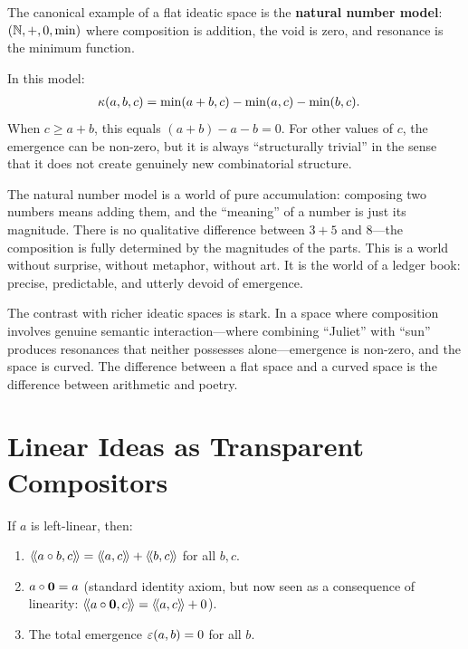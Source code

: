 The canonical example of a flat ideatic space is the \textbf{natural number model}:
$(\mathbb{N}, +, 0, \min)$ where composition is addition, the void is zero, and
resonance is the minimum function.

In this model:
\begin{align*}
\kappa(a, b, c) &= \min(a + b, c) - \min(a, c) - \min(b, c).
\end{align*}
When $c \geq a + b$, this equals $(a + b) - a - b = 0$. For other values of
$c$, the emergence can be non-zero, but it is always ``structurally trivial''
in the sense that it does not create genuinely new combinatorial structure.

\begin{interpretation}
The natural number model is a world of pure accumulation: composing two numbers
means adding them, and the ``meaning'' of a number is just its magnitude. There
is no qualitative difference between $3 + 5$ and $8$---the composition is fully
determined by the magnitudes of the parts. This is a world without surprise,
without metaphor, without art. It is the world of a ledger book: precise,
predictable, and utterly devoid of emergence.

The contrast with richer ideatic spaces is stark. In a space where composition
involves genuine semantic interaction---where combining ``Juliet'' with ``sun''
produces resonances that neither possesses alone---emergence is non-zero, and
the space is curved. The difference between a flat space and a curved space is
the difference between arithmetic and poetry.
\end{interpretation}


\section{Linear Ideas as Transparent Compositors}

\begin{theorem}
\label{thm:linear-compose}
If $a$ is left-linear, then:
\begin{enumerate}
  \item $\langle\!\langle a \circ b, c \rangle\!\rangle = \langle\!\langle a, c \rangle\!\rangle + \langle\!\langle b, c \rangle\!\rangle$ for all $b, c$.
  \item $a \circ \mathbf{0} = a$ (standard identity axiom, but now seen as a
    consequence of linearity: $\langle\!\langle a \circ \mathbf{0}, c \rangle\!\rangle = \langle\!\langle a, c \rangle\!\rangle + 0$).
  \item The total emergence $\varepsilon(a, b) = 0$ for all $b$.
\end{enumerate}
\end{theorem}

